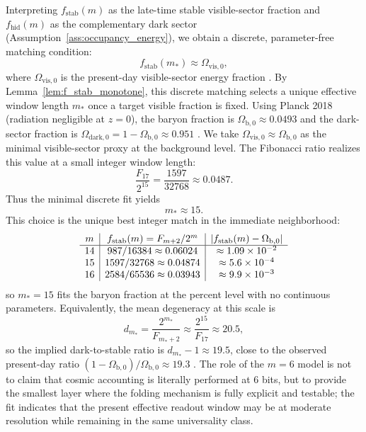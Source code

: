 Interpreting $f_{\mathrm{stab}}(m)$ as the late-time stable visible-sector fraction and $f_{\mathrm{hid}}(m)$ as the complementary dark sector (Assumption~\ref{ass:occupancy_energy}), we obtain a discrete, parameter-free matching condition:
\[
f_{\mathrm{stab}}(m_\ast)\approx \Omega_{\mathrm{vis},0},
\]
where $\Omega_{\mathrm{vis},0}$ is the present-day visible-sector energy fraction \cite{Planck2018CosmoParams}.
By Lemma~\ref{lem:f_stab_monotone}, this discrete matching selects a unique effective window length $m_\ast$ once a target visible fraction is fixed.
Using Planck 2018 (radiation negligible at $z=0$), the baryon fraction is $\Omega_{\mathrm{b},0}\approx 0.0493$ and the dark-sector fraction is $\Omega_{\mathrm{dark},0}=1-\Omega_{\mathrm{b},0}\approx 0.951$ \cite{Planck2018CosmoParams}.
We take $\Omega_{\mathrm{vis},0}\approx \Omega_{\mathrm{b},0}$ as the minimal visible-sector proxy at the background level.
The Fibonacci ratio realizes this value at a small integer window length:
\[
\frac{F_{17}}{2^{15}}=\frac{1597}{32768}\approx 0.0487.
\]
Thus the minimal discrete fit yields
\[
m_\ast \approx 15.
\]
This choice is the unique best integer match in the immediate neighborhood:
\[
\begin{array}{c|c|c}
m & f_{\mathrm{stab}}(m)=F_{m+2}/2^m & \left\lvert f_{\mathrm{stab}}(m)-\Omega_{\mathrm{b},0}\right\rvert \\
\hline
14 & 987/16384\approx 0.06024 & \approx 1.09\times 10^{-2}\\
15 & 1597/32768\approx 0.04874 & \approx 5.6\times 10^{-4}\\
16 & 2584/65536\approx 0.03943 & \approx 9.9\times 10^{-3}
\end{array}
\]
so $m_\ast=15$ fits the baryon fraction at the percent level with no continuous parameters.
Equivalently, the mean degeneracy at this scale is
\[
d_{m_\ast}=\frac{2^{m_\ast}}{F_{m_\ast+2}}\approx \frac{2^{15}}{F_{17}}\approx 20.5,
\]
so the implied dark-to-stable ratio is $d_{m_\ast}-1\approx 19.5$, close to the observed present-day ratio $(1-\Omega_{\mathrm{b},0})/\Omega_{\mathrm{b},0}\approx 19.3$ \cite{Planck2018CosmoParams}.
The role of the $m=6$ model is not to claim that cosmic accounting is literally performed at $6$ bits, but to provide the smallest layer where the folding mechanism is fully explicit and testable; the fit indicates that the present effective readout window may be at moderate resolution while remaining in the same universality class.



